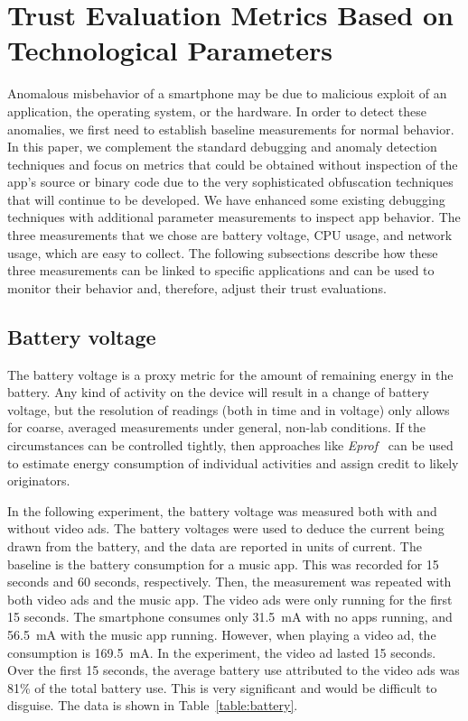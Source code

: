\section{Trust Evaluation Metrics Based on Technological Parameters}\label{sec-iheart}

Anomalous misbehavior of a smartphone may be due to malicious exploit 
of an application, the operating system, or the hardware. In order to 
detect these anomalies, we first need to establish baseline 
measurements for normal behavior. In this paper, we complement the 
standard debugging and anomaly detection techniques and focus on 
metrics that could be obtained without inspection of the app’s source 
or binary code due to the very sophisticated obfuscation techniques 
that will continue to be developed.
We have enhanced some existing debugging techniques with additional parameter measurements to inspect app behavior.
The three measurements that we chose are battery voltage, CPU usage, and network usage, which are easy to collect.
The following subsections describe how these three measurements can be linked to specific applications
and can be used to monitor their behavior and, therefore, adjust their trust evaluations.


\subsection{Battery voltage}
The battery voltage is a proxy metric for the amount of remaining 
energy in the battery. Any kind of activity on the device will result 
in a change of battery voltage, but the resolution of readings (both 
in time and in voltage) only allows for coarse, averaged measurements 
under general, non-lab conditions.
If the circumstances can be controlled tightly, then approaches like 
\textit{Eprof}~\cite{pathak2012fine} can be used to estimate energy consumption 
of individual activities and assign credit to likely originators.  

In the following experiment,
the battery voltage was measured both with and without video ads.  The battery voltages were used to
deduce the current being drawn from the battery, and the data are reported in
units of current.
The ​baseline is the battery consumption for a music app.
This was recorded for 15 seconds and 60 seconds, respectively.  Then, the measurement was repeated
with both video ads and the music app.  The video ads were only running for the first 15 seconds.
The smartphone consumes only 31.5~mA with no apps running, and 56.5~mA with the music app
running.
However, when playing a video ad, the consumption is 169.5~mA. 
In the experiment, the video ad lasted 15 seconds.
Over the first 15 seconds, the average battery use attributed to the video ads was 81\% of the total
battery use.  This is very significant and would be difficult to disguise.
The data is shown in Table~\ref{table:battery}.



